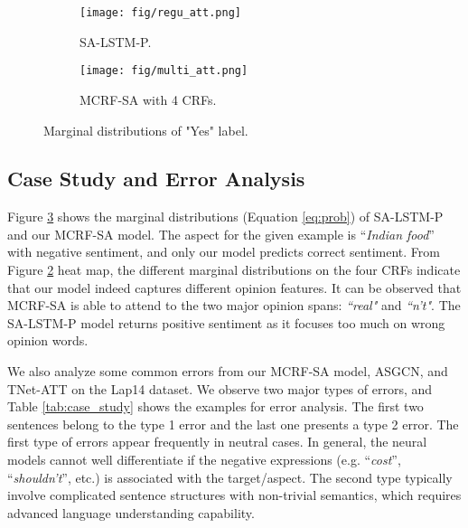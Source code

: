 \documentclass[11pt,a4paper]{article}
\begin{document}
\begin{figure}[!t]
\centering
\begin{subfigure}[b]{\columnwidth}
      \texttt{[image: fig/regu\_att.png]}
\caption{\mbox{SA-LSTM-P.}\label{fig:att2}}
      \vspace{3mm}
    \end{subfigure}
    \begin{subfigure}[b]{\columnwidth}
      \texttt{[image: fig/multi\_att.png]}
      \caption{MCRF-SA with 4 CRFs\label{fig:att3}.}
       
    \end{subfigure}

\caption[Attention Scores]{Marginal distributions of "Yes" label.}
\label{fig:case}
\vspace{-1mm}
\end{figure}

\subsection{Case Study and Error Analysis}





Figure \ref{fig:case} shows the marginal distributions (Equation \ref{eq:prob}) of  SA-LSTM-P \cite{bailin-lu:2018:AAAI2018} and our MCRF-SA model. The aspect for the given example is ``\textit{Indian food}'' with negative sentiment, and only our model predicts correct sentiment. 
From Figure \ref{fig:att3} heat map, the different marginal distributions on the four CRFs indicate that our model indeed captures different opinion features. 
It can be observed that  MCRF-SA is able to attend to the two major opinion spans: \textit{``real"} and \textit{``n't"}. 
The SA-LSTM-P model returns positive sentiment as it focuses too much on wrong opinion words. 














We also analyze some common errors from our MCRF-SA model, ASGCN, and TNet-ATT on the Lap14 dataset. We observe two major types of errors, and Table \ref{tab:case_study} shows the examples for error analysis. The first two sentences belong to the type 1 error and the last one presents a type 2 error.
{\color{black}The first type of errors appear frequently in neutral cases. In general, the neural models cannot well differentiate if the negative expressions (e.g. ``{\em cost}'', ``{\em shouldn't}'', etc.) is associated with the target/aspect.} The second type typically involve complicated sentence structures with non-trivial semantics, which requires advanced language understanding capability. 
\end{document}
